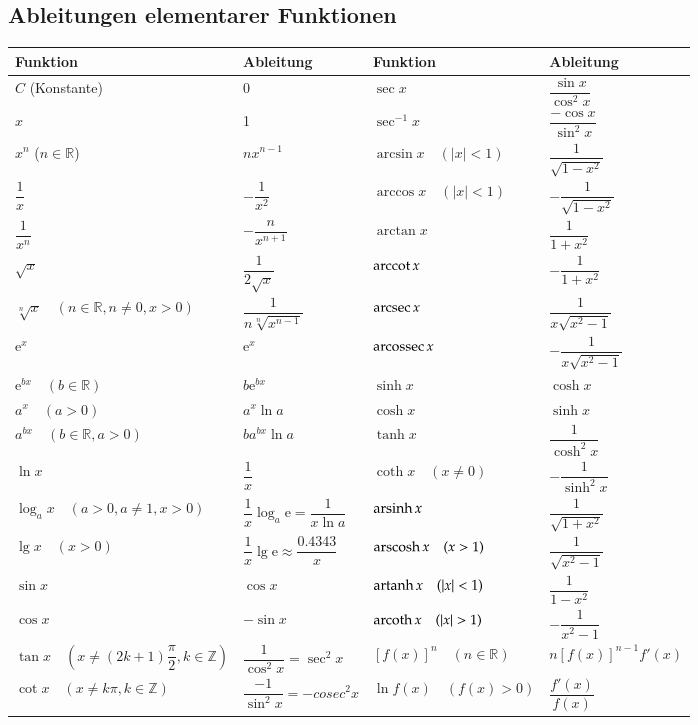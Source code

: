 \subsection{Ableitungen elementarer Funktionen}
\renewcommand{\arraystretch}{2.2}
\begin{tabular}{|l|l||l|l|}
	\hline
	\textbf{Funktion} & \textbf{Ableitung} & \textbf{Funktion} &
	\textbf{Ableitung}\\\hline
	\hline $C$ (Konstante) & 0 & $\sec x$ & $\dfrac{\sin x}{\cos^2 x}$ \\
	\hline $x$ & 1 & $\sec^{-1} x$ & $\dfrac{-\cos x}{\sin^2 x}$\\
	\hline $x^n$ ($n\in\mathbb{R}$) & $nx^{n-1}$ & $\arcsin x \quad (|x| < 1)$ &
	 $\dfrac{1}{\sqrt{1-x^2}}$\\
	\hline $\dfrac{1}{x}$ & $-\dfrac{1}{x^2}$ & $\arccos x \quad (|x| < 1)$ &
	$-\dfrac{1}{\sqrt{1-x^2}}$\\
	\hline $\dfrac{1}{x^n}$ & $-\dfrac{n}{x^{n+1}}$ & $\arctan x$ & $\dfrac{1}{1+x^2}$\\
	\hline $\sqrt{x}$ & $\dfrac{1}{2\sqrt{x}}$ & $\operatorname{arccot}{x} $ & $-\dfrac{1}{1+x^2}$\\
	\hline $\sqrt[n]{x}\quad (n\in\mathbb{R}, n \neq 0, x > 0)$ &
	$\dfrac{1}{n\sqrt[n]{x^{n-1}}}$ & $\operatorname{arcsec} x$ & $\dfrac{1}{x\sqrt{x^2-1}}$\\
	\hline $\mathrm{e}^x$ & $\mathrm{e}^x$ & $\operatorname{arcossec} x$ & $-\dfrac{1}{x\sqrt{x^2-1}}$\\
	\hline $\mathrm{e}^{bx}\quad (b\in\mathbb{R})$ & $b\mathrm{e}^{bx}$ & $\sinh x$ &
	$\cosh x$\\
	\hline $a^x\quad (a > 0)$ & $a^x\ln a$ & $\cosh x$ & $\sinh x$\\
	\hline $a^{bx}\quad (b\in\mathbb{R}, a > 0)$ & $ba^{bx}\ln a$ & $\tanh x$ &
	$\dfrac{1}{\cosh^2 x}$\\
	\hline $\ln x$ & $\dfrac{1}{x}$ & $\coth x \quad(x \neq 0)$ & $-\dfrac{1}{\sinh^2 x}$\\
	\hline $\log_a{x} \quad (a > 0, a \neq 1, x > 0)$ &
	$\dfrac{1}{x}\log_a{\mathrm{e}}=\dfrac{1}{x\ln a}$ & $\operatorname{arsinh} x$ &
	$\dfrac{1}{\sqrt{1+x^2}}$\\
	\hline $\lg x \quad (x > 0)$ & $\dfrac{1}{x}\lg \mathrm{e}\approx \dfrac{0.4343}{x}$
	& $\operatorname{arscosh} x \quad (x > 1)$ & $\dfrac{1}{\sqrt{x^2-1}}$\\
	\hline $\sin x$ & $\cos x$ & $\operatorname{artanh} x \quad (|x| < 1)$ & $\dfrac{1}{1-x^2}$\\
	\hline $\cos x$ & $-\sin x$ & $\operatorname{arcoth} x \quad (|x| > 1)$ & $-\dfrac{1}{x^2-1}$\\
	\hline $\tan x \quad (x\neq(2k+1)\dfrac{\pi}{2}, k\in\mathbb{Z})$ & $\dfrac{1}{\cos^2
		x}=\sec^2 x$ & $[f(x)]^n \quad (n\in\mathbb{R})$ & $n[f(x)]^{n-1}f'(x)$\\
	\hline $\cot x \quad (x\neq k\pi, k\in\mathbb{Z})$ & $\dfrac{-1}{\sin^2 x}=-cosec^2x$ & $\ln f(x) \quad (f(x)> 0)$ & $\dfrac{f'(x)}{f(x)}$\\
	\hline
\end{tabular}
\newpage